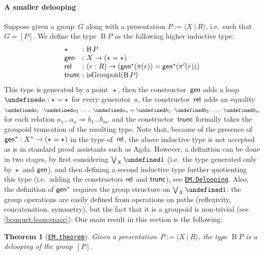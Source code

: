 \documentclass[10pt,a4paper]{amsart}
\newtheorem{theorem}{Theorem}
\theoremstyle{definition}
\newcommand{\freegroup}[1]{#1^*} %
\newcommand{\pres}[2]{\langle #1\ |\ #2\rangle} %
\newcommand{\pgroup}[1]{[#1]} %
\let\S\undefined
\newcommand{\S}[1]{\operatorname{S}^{#1}} %
\newcommand{\B}{\operatorname{B}} %
\newcommand{\pt}[1]{\star_{#1}} %
\newcommand{\defd}{:=} %
\newcommand{\pcomp}{\cdot} %
\newcommand{\fst}{\pi}
\newcommand{\snd}{\pi'}
\newcommand{\isGroupoid}{\operatorname{isGroupoid}} %
\newcommand{\constructor}[1]{\operatorname{\textsf{\textup{#1}}}}
\newcommand{\ctrunc}{\constructor{trunc}}
\newcommand{\cgen}{\constructor{gen}}
\newcommand{\crel}{\constructor{rel}}
\let\ul\undefined
\newcommand{\ul}{\underline}
\newcommand{\To}{\Rightarrow}
\newcommand{\ie}{i.e.~}
\newcommand{\agda}[2]{\href{https://smimram.github.io/generated-deloopings-agda/#1.html\##2}{\texttt{#1.#2}}}
\begin{document}
\paragraph{A smaller delooping}
Suppose given a group~$G$ along with a presentation $P\defd\pres XR$, \ie such that $G=\pgroup P$. We define the type $\B P$ as the following higher inductive type:
\[
  \begin{array}{l@{\ :\ }l}
    \pt{}&{\B P}\\
    \cgen&X\to(\pt{}=\pt{})\\
    \crel&(r:R)\to(\freegroup\cgen(\fst(r))=\freegroup\cgen(\snd(r)))\\
    \ctrunc&\isGroupoid(\B P)
  \end{array}
\]
This type is generated by a point~$\pt{}$, then the constructor~$\cgen$ adds a
loop~$\ul a:\pt{}=\pt{}$ for every generator~$a$, the constructor~$\crel$ adds
an equality
$\ul a_1\pcomp\ul a_2\pcomp\ldots\pcomp\ul a_n=\ul b_1\pcomp\ul
b_2\pcomp\ldots\pcomp\ul b_m$ for each relation
$a_1\ldots a_n\To b_1\ldots b_m$, and the constructor~$\ctrunc$ formally takes
the groupoid truncation of the resulting type. Note that, because of the
presence of $\freegroup\cgen:\freegroup X\to(\pt{}=\pt{})$ in the type
of~$\crel$, the above inductive type is not accepted as is in standard proof
assistants such as Agda. However, a definition can be done in two stages, by
first considering $\bigvee_X\S1$ (\ie the type generated only by $\pt{}$ and $\cgen$), and then defining a
second inductive type further quotienting this type (\ie adding the
constructors $\crel$ and $\ctrunc$), see \agda{EM}{Delooping}. Also, the
definition of $\freegroup\cgen$ requires the group structure on $\bigvee_X\S1$: the group operations are easily defined from operations on paths (reflexivity, concatenation, symmetry), but the fact that it is a groupoid is non-trivial (see \cref{bouquet-loop-space}).
%
Our main result in this section is the following:


\begin{theorem}[\agda{EM}{theorem}]
  \label{presented-delooping}
  Given a presentation~$P\defd\pres XR$, the type $\B P$ is a delooping of the group~$\pgroup P$.
\end{theorem}
\end{document}
